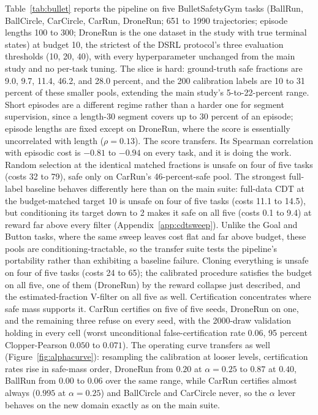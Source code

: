 \documentclass{article} %
\begin{document}
Table~\ref{tab:bullet} reports the pipeline on five BulletSafetyGym tasks (BallRun, BallCircle, CarCircle, CarRun, DroneRun; 651 to 1990 trajectories; episode lengths 100 to 300; DroneRun is the one dataset in the study with true terminal states) at budget 10, the strictest of the DSRL protocol's three evaluation thresholds (10, 20, 40), with every hyperparameter unchanged from the main study and no per-task tuning. The slice is hard: ground-truth safe fractions are 9.0, 9.7, 11.4, 46.2, and 28.0 percent, and the 200 calibration labels are 10 to 31 percent of these smaller pools, extending the main study's 5-to-22-percent range. Short episodes are a different regime rather than a harder one for segment supervision, since a length-30 segment covers up to 30 percent of an episode; episode lengths are fixed except on DroneRun, where the score is essentially uncorrelated with length ($\rho = 0.13$). The score transfers. Its Spearman correlation with episodic cost is $-0.81$ to $-0.94$ on every task, and it is doing the work. Random selection at the identical matched fractions is unsafe on four of five tasks (costs 32 to 79), safe only on CarRun's 46-percent-safe pool. The strongest full-label baseline behaves differently here than on the main suite: full-data CDT at the budget-matched target 10 is unsafe on four of five tasks (costs 11.1 to 14.5), but conditioning its target down to 2 makes it safe on all five (costs 0.1 to 9.4) at reward far above every filter (Appendix~\ref{app:cdtsweep}). Unlike the Goal and Button tasks, where the same sweep leaves cost flat and far above budget, these pools are conditioning-tractable, so the transfer suite tests the pipeline's portability rather than exhibiting a baseline failure. Cloning everything is unsafe on four of five tasks (costs 24 to 65); the calibrated procedure satisfies the budget on all five, one of them (DroneRun) by the reward collapse just described, and the estimated-fraction V-filter on all five as well. Certification concentrates where safe mass supports it. CarRun certifies on five of five seeds, DroneRun on one, and the remaining three refuse on every seed, with the 2000-draw validation holding in every cell (worst unconditional false-certification rate $0.06$, 95 percent Clopper-Pearson $0.050$ to $0.071$). The operating curve transfers as well (Figure~\ref{fig:alphacurve}): resampling the calibration at looser levels, certification rates rise in safe-mass order, DroneRun from $0.20$ at $\alpha = 0.25$ to $0.87$ at $0.40$, BallRun from $0.00$ to $0.06$ over the same range, while CarRun certifies almost always ($0.995$ at $\alpha = 0.25$) and BallCircle and CarCircle never, so the $\alpha$ lever behaves on the new domain exactly as on the main suite.
\end{document}
